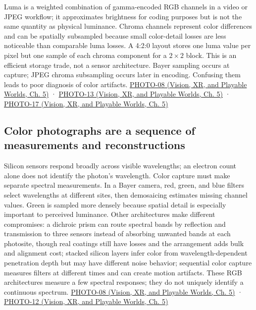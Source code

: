 Luma is a weighted combination of gamma-encoded RGB channels in a video or JPEG workflow; it approximates brightness for coding purposes but is not the same quantity as physical luminance. Chroma channels represent color differences and can be spatially subsampled because small color-detail losses are less noticeable than comparable luma losses. A 4:2:0 layout stores one luma value per pixel but one sample of each chroma component for a \(2\times2\) block. This is an efficient storage trade, not a sensor architecture. Bayer sampling occurs at capture; JPEG chroma subsampling occurs later in encoding. Confusing them leads to poor diagnosis of color artifacts. \href{../07-Vision-XR-and-Playable-Worlds/main.pdf\#nameddest=04-visual-computing-ii-ch036-photo-08---photography-session-08}{PHOTO-08 (Vision, XR, and Playable Worlds, Ch. 5)} · \href{../07-Vision-XR-and-Playable-Worlds/main.pdf\#nameddest=04-visual-computing-ii-ch036-photo-13---photography-session-13}{PHOTO-13 (Vision, XR, and Playable Worlds, Ch. 5)} · \href{../07-Vision-XR-and-Playable-Worlds/main.pdf\#nameddest=04-visual-computing-ii-ch036-photo-17---photography-session-17}{PHOTO-17 (Vision, XR, and Playable Worlds, Ch. 5)}

\subsection{Color photographs are a sequence of measurements and reconstructions}\label{03-visual-computing-i-ch004-color-photographs-are-a-sequence-of-measurements-and-reconstructions}

\hypertarget{03-visual-computing-i-ch004-color-photographs-are-a-sequence-of-measurements-and-reconstructions}{}

Silicon sensors respond broadly across visible wavelengths; an electron count alone does not identify the photon's wavelength. Color capture must make separate spectral measurements. In a Bayer camera, red, green, and blue filters select wavelengths at different sites, then demosaicing estimates missing channel values. Green is sampled more densely because spatial detail is especially important to perceived luminance. Other architectures make different compromises: a dichroic prism can route spectral bands by reflection and transmission to three sensors instead of absorbing unwanted bands at each photosite, though real coatings still have losses and the arrangement adds bulk and alignment cost; stacked silicon layers infer color from wavelength-dependent penetration depth but may have different noise behavior; sequential color capture measures filters at different times and can create motion artifacts. These RGB architectures measure a few spectral responses; they do not uniquely identify a continuous spectrum. \href{../07-Vision-XR-and-Playable-Worlds/main.pdf\#nameddest=04-visual-computing-ii-ch036-photo-08---photography-session-08}{PHOTO-08 (Vision, XR, and Playable Worlds, Ch. 5)} · \href{../07-Vision-XR-and-Playable-Worlds/main.pdf\#nameddest=04-visual-computing-ii-ch036-photo-12---photography-session-12}{PHOTO-12 (Vision, XR, and Playable Worlds, Ch. 5)}

